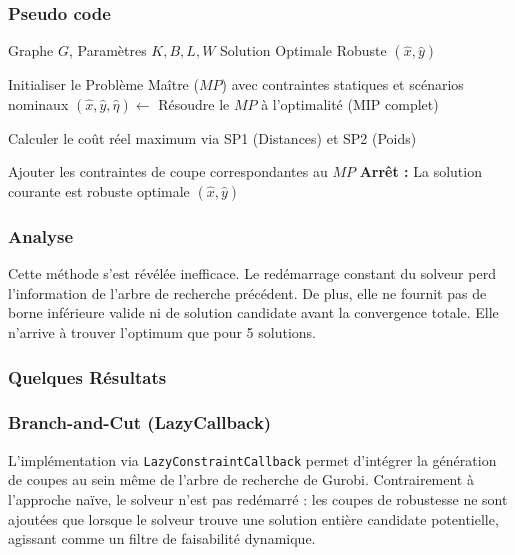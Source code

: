 \documentclass{article}
\begin{document}
\subsubsection*{Pseudo code}
\begin{algorithm}
\caption{Plans Coupants Naïfs}
\begin{algorithmic}[1]
\REQUIRE Graphe $G$, Paramètres $K, B, L, W$
\ENSURE Solution Optimale Robuste $(\hat{x}, \hat{y})$

\STATE Initialiser le Problème Maître ($MP$) avec contraintes statiques et scénarios nominaux
    \STATE $(\hat{x}, \hat{y}, \hat{\eta}) \leftarrow$ Résoudre le $MP$ à l'optimalité (MIP complet)
    
    \STATE Calculer le coût réel maximum via SP1 (Distances) et SP2 (Poids)
    
        \STATE Ajouter les contraintes de coupe correspondantes au $MP$
    \ELSE
        \STATE \textbf{Arrêt :} La solution courante est robuste optimale
        \RETURN $(\hat{x}, \hat{y})$
    \ENDIF
\ENDWHILE
\end{algorithmic}
\end{algorithm}
\subsubsection*{Analyse } Cette méthode s'est révélée inefficace. Le redémarrage constant du solveur perd l'information de l'arbre de recherche précédent. De plus, elle ne fournit pas de borne inférieure valide ni de solution candidate avant la convergence totale. Elle n'arrive à trouver l'optimum que pour 5 solutions.
\subsubsection*{Quelques Résultats}

\subsubsection{Branch-and-Cut (LazyCallback)}
L'implémentation via \texttt{LazyConstraintCallback} permet d'intégrer la génération de coupes au sein même de l'arbre de recherche de Gurobi. Contrairement à l'approche naïve, le solveur n'est pas redémarré : les coupes de robustesse ne sont ajoutées que lorsque le solveur trouve une solution entière candidate potentielle, agissant comme un filtre de faisabilité dynamique.
\end{document}
